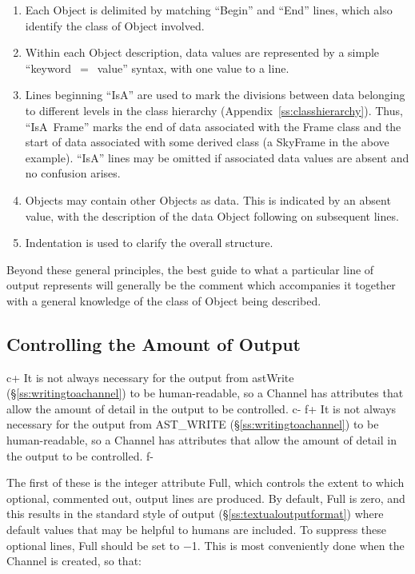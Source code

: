 \documentclass[twoside,11pt]{article}
\newcommand{\appref}[1]{Appendix~\ref{#1}}
\newcommand{\secref}[1]{\S\ref{#1}}
\newcommand{\appref}[1]{\ref{#1}}
\newcommand{\secref}[1]{\ref{#1}}
\begin{document}
\begin{enumerate}
\item Each Object is delimited by matching ``Begin'' and ``End''
lines, which also identify the class of Object involved.

\item Within each Object description, data values are represented
by a simple ``keyword~$=$~value'' syntax, with one value to a line.

\item Lines beginning ``IsA'' are used to mark the divisions between
data belonging to different levels in the class hierarchy
(\appref{ss:classhierarchy}). Thus, ``IsA~Frame'' marks the end of data
associated with the Frame class and the start of data associated with
some derived class (a SkyFrame in the above example). ``IsA'' lines
may be omitted if associated data values are absent and no confusion
arises.

\item Objects may contain other Objects as data. This is
indicated by an absent value, with the description of the data
Object following on subsequent lines.

\item Indentation is used to clarify the overall structure.
\end{enumerate}

Beyond these general principles, the best guide to what a particular
line of output represents will generally be the comment which
accompanies it together with a general knowledge of the class of
Object being described.

\subsection{\label{ss:controllingchanneloutput}Controlling the Amount of Output}

c+
It is not always necessary for the output from astWrite
(\secref{ss:writingtoachannel}) to be human-readable, so a Channel has
attributes that allow the amount of detail in the output to be
controlled.
c-
f+
It is not always necessary for the output from AST\_WRITE
(\secref{ss:writingtoachannel}) to be human-readable, so a Channel has
attributes that allow the amount of detail in the output to be
controlled.
f-

The first of these is the integer attribute Full, which controls the
extent to which optional, commented out, output lines are produced. By
default, Full is zero, and this results in the standard style of
output (\secref{ss:textualoutputformat}) where default values that may
be helpful to humans are included. To suppress these optional lines,
Full should be set to $-$1. This is most conveniently done when the
Channel is created, so that:
\end{document}
